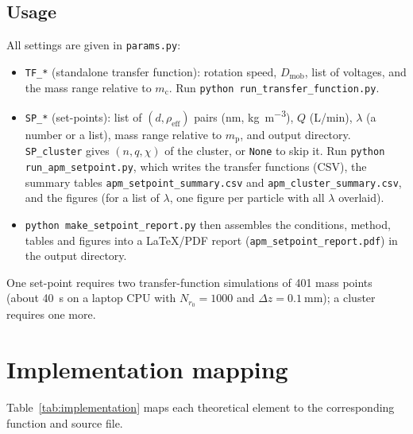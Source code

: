 \documentclass[11pt,a4paper]{article}
\begin{document}
\subsection{Usage}
\label{sec:setpoint-usage}

All settings are given in \texttt{params.py}:
\begin{itemize}
  \item \texttt{TF\_*} (standalone transfer function): rotation speed,
    $D_{\mathrm{mob}}$, list of voltages, and the mass range relative to
    $m_{\mathrm{c}}$. Run \texttt{python run\_transfer\_function.py}.
  \item \texttt{SP\_*} (set-points): list of $(d, \rho_{\mathrm{eff}})$ pairs
    (\si{\nano\meter}, \si{\kilo\gram\per\meter\cubed}), $Q$ (L/min),
    $\lambda$ (a number or a list), mass range relative to
    $m_{\mathrm{p}}$, and output directory. \texttt{SP\_cluster} gives
    $(n, q, \chi)$ of the cluster, or \texttt{None} to skip it. Run
    \texttt{python run\_apm\_setpoint.py}, which writes the transfer
    functions (CSV), the summary tables \texttt{apm\_setpoint\_summary.csv}
    and \texttt{apm\_cluster\_summary.csv}, and the figures (for a list of
    $\lambda$, one figure per particle with all $\lambda$ overlaid).
  \item \texttt{python make\_setpoint\_report.py} then assembles the
    conditions, method, tables and figures into a LaTeX/PDF report
    (\texttt{apm\_setpoint\_report.pdf}) in the output directory.
\end{itemize}
One set-point requires two transfer-function simulations of 401 mass points
(about \SI{40}{\second} on a laptop CPU with $N_{r_{0}} = 1000$ and
$\Delta z = \SI{0.1}{\milli\meter}$); a cluster requires one more.

\section{Implementation mapping}
\label{sec:implementation}

Table~\ref{tab:implementation} maps each theoretical element to the
corresponding function and source file.
\end{document}
